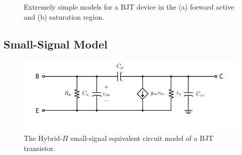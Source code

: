 \begin{figure}[tb]
\begin{center}
\end{center}
\caption{Extremely simple models for a BJT device in the (a) forward active and (b) saturation region.} \label{fig:slide19}
\end{figure} 






\subsection{Small-Signal Model}

\begin{figure}[tb]
\begin{center}
\includegraphics[scale=1]{bjt_hybridpi}
\end{center}
\caption{The Hybrid-$\Pi$ small-signal equivalent circuit model of a BJT transistor.} \label{fig:bjt_hybridpi}
\end{figure}

